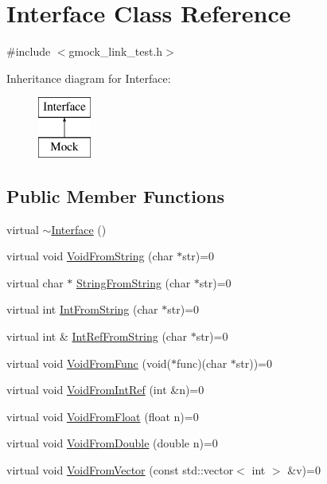 \hypertarget{classInterface}{}\section{Interface Class Reference}
\label{classInterface}


{\ttfamily \#include $<$gmock\+\_\+link\+\_\+test.\+h$>$}

Inheritance diagram for Interface\+:\begin{figure}[H]
\begin{center}
\leavevmode
\includegraphics[height=2.000000cm]{classInterface}
\end{center}
\end{figure}
\subsection*{Public Member Functions}
\begin{DoxyCompactItemize}
\item 
virtual \mbox{\hyperlink{classInterface_a67eca71a4ef8d28dc959dd495e2b2b59}{$\sim$\+Interface}} ()
\item 
virtual void \mbox{\hyperlink{classInterface_a65d6ae604e7e9a513aec72c9c94e0b97}{Void\+From\+String}} (char $\ast$str)=0
\item 
virtual char $\ast$ \mbox{\hyperlink{classInterface_a756b1d22c12aa3f14a5083f90043fbf0}{String\+From\+String}} (char $\ast$str)=0
\item 
virtual int \mbox{\hyperlink{classInterface_ab34c8a5fd2236a6b009f86a4e5851b61}{Int\+From\+String}} (char $\ast$str)=0
\item 
virtual int \& \mbox{\hyperlink{classInterface_ab93276de67e60c44fd775d4c139aa8e1}{Int\+Ref\+From\+String}} (char $\ast$str)=0
\item 
virtual void \mbox{\hyperlink{classInterface_a7dab3c82b857a9a5f52b3ce6f7df547f}{Void\+From\+Func}} (void($\ast$func)(char $\ast$str))=0
\item 
virtual void \mbox{\hyperlink{classInterface_aa43fb56650a57b6b3e7743e54e50cb86}{Void\+From\+Int\+Ref}} (int \&n)=0
\item 
virtual void \mbox{\hyperlink{classInterface_ae2b3e9411c893a45642d3af632752c66}{Void\+From\+Float}} (float n)=0
\item 
virtual void \mbox{\hyperlink{classInterface_aa56524017aabdbe46510648c711ab8a8}{Void\+From\+Double}} (double n)=0
\item 
virtual void \mbox{\hyperlink{classInterface_ae84fe7e53f881db2f823ad35d004927a}{Void\+From\+Vector}} (const std\+::vector$<$ int $>$ \&v)=0
\end{DoxyCompactItemize}


